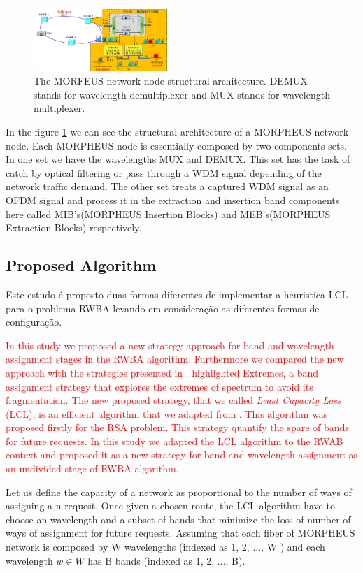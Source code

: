 \documentclass[journal,comsoc]{IEEEtran}
\begin{document}
\begin{figure}[h]
\centering
\includegraphics[width=0.45\textwidth]{NodeArchitecture2.png}
\caption{The MORFEUS network node structural architecture. DEMUX stands for wavelength demultiplexer and MUX stands for wavelength multiplexer.}
\label{morpheus_arch_node}
\end{figure}

In the figure \ref{morpheus_arch_node} we can see the structural architecture of a MORPHEUS network node. Each MORPHEUS node is essentially composed by two components sets. In one set we have the wavelengths MUX and DEMUX. This set has the task of catch by optical filtering or pass through a WDM signal depending of the network traffic demand. The other set treats a captured WDM signal as an OFDM signal and process it in the extraction and insertion band components here called MIB's(MORPHEUS Insertion Blocks) and MEB's(MORPHEUS Extraction Blocks) respectively.

\subsection{Proposed Algorithm}

Este estudo é proposto duas formas diferentes de implementar a heuristica LCL para o problema RWBA levando em consideração as diferentes formas de configuração.

\textcolor{red}{In this study we proposed a new strategy approach for band and wavelength assignment stages in the RWBA algorithm. Furthermore we compared the new approach with the strategies presented in \cite{imoc_2015}.
highlighted Extremes, a band assignment strategy that explores the extremes of spectrum to avoid its fragmentation. The new proposed strategy, that we called \textit{Least Capacity Loss} (LCL), is an efficient algorithm that we adapted from \cite{raul_lcl}. This algorithm was proposed firstly for the RSA problem. This strategy quantify the spare of bands for future requests. In this study we adapted the LCL algorithm to the RWAB context and proposed it as a new strategy for band and wavelength assignment as an undivided stage of RWBA algorithm.}

Let us define the capacity of a network as proportional to the number of ways of assigning a n-request. Once given a chosen route, the LCL algorithm have to choose an wavelength and a subset of bands that minimize the loss of number of ways of assignment for future requests. Assuming that each fiber of MORPHEUS network is composed by W wavelengths (indexed as 1, 2, ..., W ) and each wavelength $w \in W$ has B bands (indexed as 1, 2, ..., B).
\end{document}
